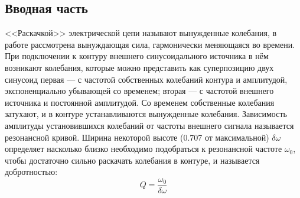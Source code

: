 \documentclass[a4paper,12pt]{article} %
\begin{document}
\subsection*{Вводная часть}
<<Раскачкой>> электрической цепи называют вынужденные колебания, в работе рассмотрена вынуждающая сила, гармонически меняющаяся во времени. При подключении к контуру внешнего синусоидального источника в
нём возникают колебания, которые можно представить как суперпозицию
двух синусоид \cite{labnik} первая — с частотой собственных колебаний
контура и амплитудой, экспоненциально убывающей со временем; вторая
— с частотой внешнего источника и постоянной амплитудой. Со временем
собственные колебания затухают, и в контуре устанавливаются
вынужденные колебания. Зависимость амплитуды установившихся
колебаний от частоты внешнего сигнала называется резонансной
кривой. Ширина некоторой высоте (0.707 от максимальной) $\delta \omega$ определяет насколько близко необходимо подобраться к резонансной частоте $\omega_0$, чтобы достаточно сильно раскачать колебания в контуре, и называется добротностью:
\begin{equation}
\label{кривые}
Q=\frac{\omega_0}{\delta \omega}
\end{equation}
\end{document}
